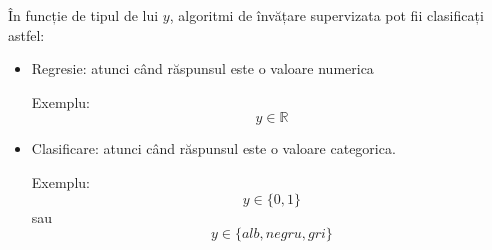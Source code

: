  
În funcție de tipul de lui ${y}$, algoritmi de învățare supervizata pot fii clasificați astfel:
\begin{itemize}
	\item Regresie: atunci când răspunsul este o valoare numerica
	
	Exemplu: $${y \in \mathbb{R}}$$
	
	\item Clasificare: atunci când răspunsul este o valoare categorica.
	
	Exemplu: $${y \in \{0,1\}}$$ sau  $${y \in \{alb,negru,gri\}}$$
\end{itemize}